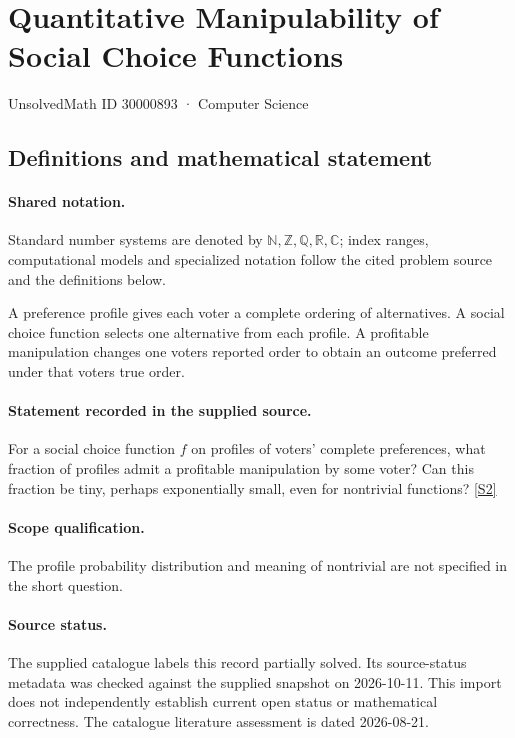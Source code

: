 \documentclass[11pt]{article}
\newcommand{\sref}[2]{\hyperlink{source:#1:#2}{[S#2]}}
\begin{document}
\setcounter{section}{30000892}
\section{Quantitative Manipulability of Social Choice Functions}\label{30000893}
{\small\sffamily UnsolvedMath ID 30000893 · Computer Science}
\subsection{Definitions and mathematical statement}

\paragraph{Shared notation.}Standard number systems are denoted by $\mathbb N,\mathbb Z,\mathbb Q,\mathbb R,\mathbb C$; index ranges, computational models and specialized notation follow the cited problem source and the definitions below.


A preference profile gives each voter a complete ordering of alternatives. A social choice function selects one alternative from each profile. A profitable manipulation changes one voter\textquotesingle s reported order to obtain an outcome preferred under that voter\textquotesingle s true order.
\paragraph{Statement recorded in the supplied source.}
For a social choice function $f$ on profiles of voters' complete preferences, what fraction of profiles admit a profitable manipulation by some voter? Can this fraction be tiny, perhaps exponentially small, even for nontrivial functions? \sref{30000893}{2}
\paragraph{Scope qualification.}
The profile probability distribution and meaning of nontrivial are not specified in the short question.
\paragraph{Source status.}
The supplied catalogue labels this record partially solved. Its source-status metadata was checked against the supplied snapshot on 2026-10-11. This import does not independently establish current open status or mathematical correctness. The catalogue literature assessment is dated 2026-08-21.
\end{document}
